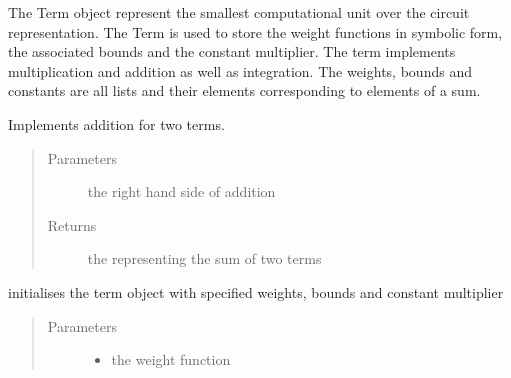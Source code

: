 \documentclass[letterpaper,10pt,english,openany,oneside]{sphinxmanual}
\begin{document}
\begin{fulllineitems}
\label{\detokenize{index:term.Term}}
The Term object represent the smallest computational unit over the circuit representation. The Term is used to store the weight
functions in symbolic form, the associated bounds and the constant multiplier. The term implements multiplication and addition as well
as integration. The weights, bounds and constants are all lists and their elements corresponding to elements of a sum.

\begin{fulllineitems}
\label{\detokenize{index:term.Term.__add__}}
Implements addition for two terms.
\begin{quote}\begin{description}
\item[{Parameters}] \leavevmode
{} \textendash{} the right hand side {\hyperref[\detokenize{index:term.Term}]{}} of addition

\item[{Returns}] \leavevmode
the {\hyperref[\detokenize{index:term.Term}]{}} representing the sum of two terms

\end{description}\end{quote}

\end{fulllineitems}


\begin{fulllineitems}
\label{\detokenize{index:term.Term.__init__}}
initialises the term object with specified weights, bounds and constant multiplier
\begin{quote}\begin{description}
\item[{Parameters}] \leavevmode\begin{itemize}
\item {} 
 \textendash{} the weight function


\end{itemize}
\end{description}
\end{quote}
\end{fulllineitems}
\end{fulllineitems}
\end{document}
